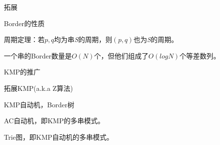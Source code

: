 \documentclass{ctexbeamer}		%
\begin{document}
\begin{frame}{拓展}

\begin{block}{Border的性质}

周期定理：若$p,q$均为串\textit{S}的周期，则$(p,q)$也为\textit{S}的周期。

\hphantom{ }

一个串的Border数量是$O(N)$个，但他们组成了$O(logN)$个等差数列。

\end{block}

\begin{block}{KMP的推广}

拓展KMP(a.k.a Z算法)

\hphantom{}

KMP自动机，Border树

\hphantom{}

AC自动机，即KMP的多串模式。

\hphantom{}

Trie图，即KMP自动机的多串模式。

\end{block}
    
\end{frame}
\end{document}
